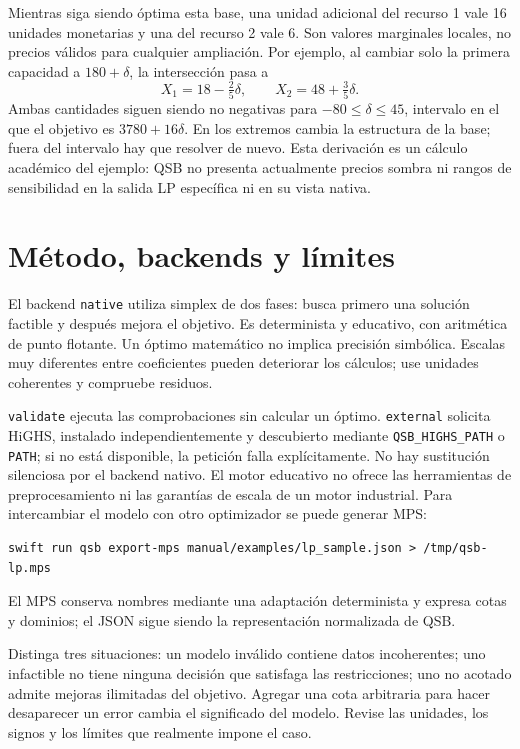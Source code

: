 Mientras siga siendo óptima esta base, una unidad adicional del recurso 1
vale 16 unidades monetarias y una del recurso 2 vale 6. Son valores marginales
locales, no precios válidos para cualquier ampliación. Por ejemplo, al cambiar
solo la primera capacidad a \(180+\delta\), la intersección pasa a
\[
 X_1=18-\tfrac25\delta,\qquad X_2=48+\tfrac35\delta.
\]
Ambas cantidades siguen siendo no negativas para
\(-80\leq\delta\leq45\), intervalo en el que el objetivo es
\(3780+16\delta\). En los extremos cambia la estructura de la base;
fuera del intervalo hay que resolver de nuevo. Esta derivación es un cálculo
académico del ejemplo: QSB no presenta actualmente precios sombra ni rangos
de sensibilidad en la salida LP específica ni en su vista nativa.

\section{Método, backends y límites}
El backend \texttt{native} utiliza simplex de dos fases: busca primero una
solución factible y después mejora el objetivo. Es determinista y educativo,
con aritmética de punto flotante. Un óptimo matemático no implica precisión
simbólica. Escalas muy diferentes entre coeficientes pueden deteriorar los
cálculos; use unidades coherentes y compruebe residuos.

\texttt{validate} ejecuta las comprobaciones sin calcular un óptimo.
\texttt{external} solicita HiGHS, instalado independientemente y descubierto
mediante \texttt{QSB\_HIGHS\_PATH} o \texttt{PATH}; si no está disponible, la
petición falla explícitamente. No hay sustitución silenciosa por el backend
nativo. El motor educativo no ofrece las herramientas de preprocesamiento ni
las garantías de escala de un motor industrial. Para intercambiar el modelo
con otro optimizador se puede generar MPS:
\begin{lstlisting}
swift run qsb export-mps manual/examples/lp_sample.json > /tmp/qsb-lp.mps
\end{lstlisting}
El MPS conserva nombres mediante una adaptación determinista y expresa cotas
y dominios; el JSON sigue siendo la representación normalizada de QSB.

Distinga tres situaciones: un modelo inválido contiene datos incoherentes;
uno infactible no tiene ninguna decisión que satisfaga las restricciones; uno
no acotado admite mejoras ilimitadas del objetivo. Agregar una cota arbitraria
para hacer desaparecer un error cambia el significado del modelo. Revise las
unidades, los signos y los límites que realmente impone el caso.

